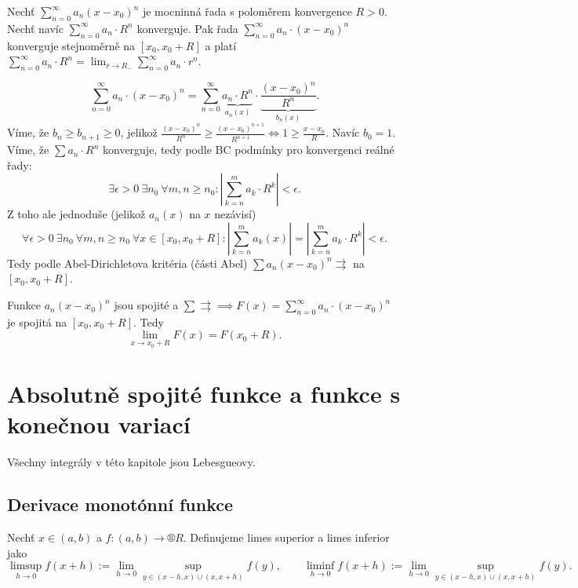 \documentclass[12pt]{article}					%
\begin{document}
	\begin{veta}[Abelova]
		Nechť $\sum_{n=0}^∞ a_n (x - x_0)^n$ je mocninná řada s poloměrem konvergence $R > 0$. Nechť navíc $\sum_{n=0}^∞ a_n · R^n$ konverguje. Pak řada $\sum_{n=0}^∞ a_n·(x - x_0)^n$ konverguje stejnoměrně na $[x_0, x_0 + R]$ a platí $\sum_{n=0}^∞ a_n·R^n = \lim_{r \rightarrow R_-} \sum_{n=0}^∞ a_n · r^n$.

		\begin{dukazin}
			$$ \sum_{n=0}^∞ a_n · (x - x_0)^n = \sum_{n=0}^∞ \underbrace{a_n·R^n}_{a_n(x)}·\underbrace{\frac{(x - x_0)^n}{R^n}}_{b_n(x)}. $$
			Víme, že $b_n ≥ b_{n+1} ≥ 0$, jelikož $\frac{(x - x_0)^n}{R^n} ≥ \frac{(x - x_0)^{n+1}}{R^{n+1}} \Leftrightarrow 1 ≥ \frac{x - x_0}{R}$. Navíc $b_0 = 1$. Víme, že $\sum a_n·R^n$ konverguje, tedy podle BC podmínky pro konvergenci reálné řady:
			$$ \exists \epsilon > 0\ \exists n_0\ \forall m, n ≥ n_0: |\sum_{k=n}^m a_k·R^k| < \epsilon. $$
			Z toho ale jednoduše (jelikož $a_n(x)$ na $x$ nezávisí)
			$$ \forall \epsilon > 0\ \exists n_0\ \forall m, n ≥ n_0\ \forall x \in [x_0, x_0 + R]: |\sum_{k=n}^m a_k(x)| = |\sum_{k=n}^m a_k·R^k| < \epsilon. $$
			Tedy podle Abel-Dirichletova kritéria (části Abel) $\sum a_n(x - x_0)^n \rightrightarrows$ na $[x_0, x_0 + R]$.

			Funkce $a_n (x - x_0)^n$ jsou spojité a $\sum \rightrightarrows \implies F(x) = \sum_{n=0}^∞ a_n·(x - x_0)^n$ je spojitá na $[x_0, x_0 + R]$. Tedy
			$$ \lim_{x \rightarrow x_0 + R} F(x) = F(x_0 + R). $$
		\end{dukazin}
	\end{veta}

\section{Absolutně spojité funkce a funkce s konečnou variací}
	\begin{poznamka}
		Všechny integrály v této kapitole jsou Lebesgueovy.
	\end{poznamka}

	\subsection{Derivace monotónní funkce}
	\begin{definice}
		Nechť $x \in (a, b)$ a $f: (a, b) \rightarrow ®R$. Definujeme limes superior a limes inferior jako
		$$ \limsup_{h \rightarrow 0} f(x + h) := \lim_{h \rightarrow 0} \sup_{y \in (x - h, x) \cup (x, x + h)} f(y), \qquad \liminf_{h \rightarrow 0} f(x + h) := \lim_{h \rightarrow 0} \sup_{y \in (x - h, x) \cup (x, x + h)} f(y).$$
	\end{definice}
\end{document}
